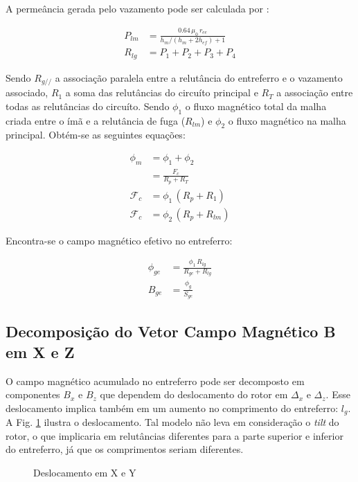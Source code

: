 A permeância gerada pelo vazamento pode ser calculada por \citep{Leupold1996a}: 

\begin{align}
P_{lm} &= \frac{0.64 \,  \mu_0 \,r_{ee}}{h_m/(h_m+2h_{ef})+1} \\
R_{lg} &= P_1 + P_2 + P_3 + P_4	
\end{align} 

Sendo $R_{g//}$ a associação paralela entre a relutância do entreferro e o vazamento associado, $R_1$ a soma das relutâncias do circuíto principal e $R_T$ a associação entre todas as relutâncias do circuíto. Sendo  $\phi_1$ o fluxo magnético total da malha criada entre o ímã e a relutância de fuga ($R_{lm}$) e $\phi_2$ o fluxo magnético na malha principal. Obtém-se as seguintes equações:

\begin{align}
\phi_m &= \phi_1 + \phi_2 \\
&= \frac{F_c}{R_p + R_T} \\
\mathcal{F}_c	 &= \phi_1 \, (R_p + R_1) \\
\mathcal{F}_c    &= \phi_2 \, (R_p + R_{lm})
\end{align}

Encontra-se o campo magnético efetivo no entreferro:

\begin{align}
\phi_{ge} &= \frac{\phi_1 \, R_{lg}}{R_{ge}+R_{lg}} \\
B_{ge} &= \frac{\phi_g}{S_{ge}}
\end{align}


\subsection{Decomposição do Vetor Campo Magnético B em X e Z} \label{SubSec:CampoX/Y}

O campo magnético acumulado no entreferro pode ser decomposto em componentes $B_x$ e $B_z$ que dependem do deslocamento do rotor em $\Delta_x$ e $\Delta_z$. Esse deslocamento implica também em um aumento no comprimento do entreferro: $l_g$. A Fig. \ref{Fig:modelo:passivo:DxDz} ilustra o deslocamento. Tal modelo não leva em consideração o \textit{tilt} do rotor, o que implicaria em relutâncias diferentes para a parte superior e inferior do entreferro, já que os comprimentos seriam diferentes. 

\begin{figure}[!ht]
	\centering
	\def\svgwidth{0.6\columnwidth}
	
	\caption{Deslocamento em X e Y}
	\label{Fig:modelo:passivo:DxDz}
\end{figure}


